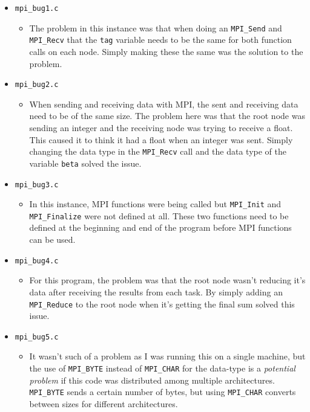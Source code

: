 \documentclass[addpoints]{exam}
\begin{document}
\begin{questions}
\begin{solution}
\begin{itemize}
\item {\tt mpi\_bug1.c}
     \begin{itemize}
       \item The problem in this instance was that when doing an {\tt MPI\_Send} and {\tt MPI\_Recv} that the {\tt tag} variable needs to be the same for both function calls on each node. Simply making these the same was the solution to the problem.
     \end{itemize}
\item {\tt mpi\_bug2.c}
     \begin{itemize}
       \item When sending and receiving data with MPI, the sent and receiving data need to be of the same size. The problem here was that the root node was sending an integer and the receiving node was trying to receive a float. This caused it to think it had a float when an integer was sent. Simply changing the data type in the {\tt MPI\_Recv} call and the data type of the variable {\tt beta} solved the issue.
     \end{itemize}
\item {\tt mpi\_bug3.c}
     \begin{itemize}
       \item In this instance, MPI functions were being called but {\tt MPI\_Init} and {\tt MPI\_Finalize} were not defined at all. These two functions need to be defined at the beginning and end of the program before MPI functions can be used.
     \end{itemize}
\item {\tt mpi\_bug4.c}
     \begin{itemize}
       \item For this program, the problem was that the root node wasn't reducing it's data after receiving the results from each task. By simply adding an {\tt MPI\_Reduce} to the root node when it's getting the final sum solved this issue.
     \end{itemize}
\item {\tt mpi\_bug5.c}
     \begin{itemize}
       \item It wasn't such of a problem as I was running this on a single machine, but the use of {\tt MPI\_BYTE} instead of {\tt MPI\_CHAR} for the data-type is a {\em potential problem} if this code was distributed among multiple architectures. {\tt MPI\_BYTE} sends a certain number of bytes, but using {\tt MPI\_CHAR} converts between sizes for different architectures.

\end{itemize}
\end{itemize}
\end{solution}
\end{questions}
\end{document}
